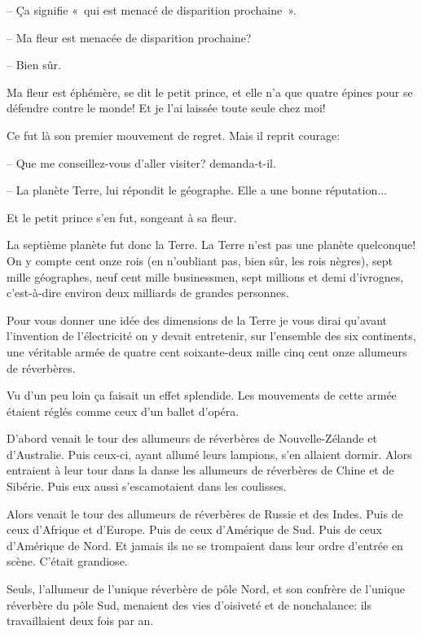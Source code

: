 \documentclass[a4paper]{report}
\begin{document}
-- Ça signifie «~qui est menacé de disparition prochaine~».

-- Ma fleur est menacée de disparition prochaine?

-- Bien sûr.

Ma fleur est éphémère, se dit le petit prince, et elle n'a que quatre épines pour se défendre contre le monde! Et je l'ai laissée toute seule chez moi!

Ce fut là son premier mouvement de regret. Mais il reprit courage:

-- Que me conseillez-vous d'aller visiter? demanda-t-il.

-- La planète Terre, lui répondit le géographe. Elle a une bonne réputation...

Et le petit prince s'en fut, songeant à sa fleur.

\parachapter{} %
La septième planète fut donc la Terre.
La Terre n'est pas une planète quelconque! On y compte cent onze rois (en n'oubliant pas, bien sûr, les rois nègres), sept mille géographes, neuf cent mille businessmen, sept millions et demi d'ivrognes, c'est-à-dire environ deux milliards de grandes personnes.

Pour vous donner une idée des dimensions de la Terre je vous dirai qu'avant l'invention de l'électricité on y devait entretenir, sur l'ensemble des six continents, une véritable armée de quatre cent soixante-deux mille cinq cent onze allumeurs de réverbères.

Vu d'un peu loin ça faisait un effet splendide. Les mouvements de cette armée étaient réglés comme ceux d'un ballet d'opéra.

D'abord venait le tour des allumeurs de réverbères de Nouvelle-Zélande et d'Australie. Puis ceux-ci, ayant allumé leurs lampions, s'en allaient dormir. Alors entraient à leur tour dans la danse les allumeurs de réverbères de Chine et de Sibérie. Puis eux aussi s'escamotaient dans les coulisses.

Alors venait le tour des allumeurs de réverbères de Russie et des Indes. Puis de ceux d'Afrique et d'Europe. Puis de ceux d'Amérique de Sud. Puis de ceux d'Amérique de Nord. Et jamais ils ne se trompaient dans leur ordre d'entrée en scène. C'était grandiose.

Seuls, l'allumeur de l'unique réverbère de pôle Nord, et son confrère de l'unique réverbère du pôle Sud, menaient des vies d'oisiveté et de nonchalance: ils travaillaient deux fois par an.
\end{document}
